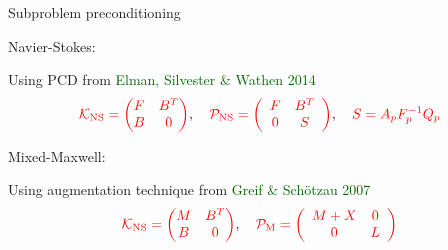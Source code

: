 \documentclass[12pt]{beamer}
\newcommand{\gr}[1]{\textcolor{darkgreen} {#1}}
\newcommand{\re}[1]{{\textcolor{red}       {#1}}}
\begin{document}
\begin{frame}{Subproblem preconditioning}



{\large Navier-Stokes:}

\noindent Using PCD from \gr{Elman, Silvester \& Wathen 2014}
$$\re{\mathcal{K}_{\rm NS}=\begin{pmatrix}
F & B^T \\
B & 0
\end{pmatrix}},\quad \re{\mathcal{P}_{\rm NS}=\left(\begin{array}{cc}
F & B^T \\
0 & S
\end{array}\right)}, \quad \re{S =A_p F_p^{-1}Q_p}$$

\vspace{5mm}

{\large Mixed-Maxwell:}

\noindent Using augmentation technique from \gr{Greif \& Sch{\"o}tzau 2007}
$$\re{\mathcal{K}_{\rm NS}=\begin{pmatrix}
M & B^T \\
B & 0
\end{pmatrix}}, \quad \re{\mathcal{P}_{\rm M}=\left(\begin{array}{cc}
M+X & 0 \\
0 & L
\end{array}\right)}$$

\end{frame}

\end{document}
